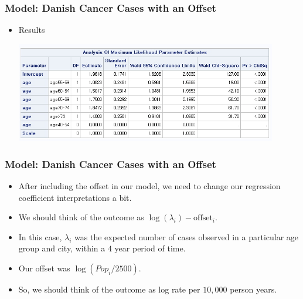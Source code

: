 \documentclass[10pt,xcolor={svgnames},t]{beamer}
\begin{document}
%
%
\begin{frame}
	\frametitle{Model: Danish Cancer Cases with an Offset}
	
	\begin{itemize}
		\item Results
		\begin{center}
			\includegraphics[width=0.9\textwidth]{result2.jpg}
		\end{center}
	\end{itemize}
	
	
\end{frame}
%
%
\begin{frame}
	\frametitle{Model: Danish Cancer Cases with an Offset}
	
	\begin{itemize}
		\item After including the offset in our model, we need to change our regression coefficient interpretations a bit.
				\bigskip
		\item We should think of the outcome as $\log(\lambda_i)-\text{offset}_i$.
				\bigskip
		\item In this case, $\lambda_i$ was the expected number of cases observed in a particular age group and city, within a $4$ year period of time.
		\bigskip
		\item Our offset was $\log(Pop_i/2500)$.
				\bigskip
		\item So, we should think of the outcome as log rate per $10,000$ person years.
	\end{itemize}
	
	
\end{frame}
\end{document}
